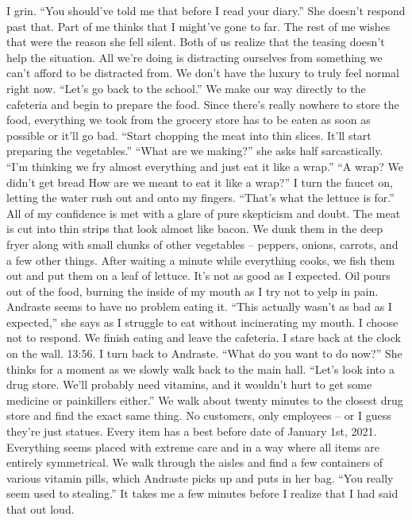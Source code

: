 \documentclass[a4paper, 12pt]{book}
\newcommand\tab[1][1cm]{\hspace*{#1}}
\begin{document}
\newline
\tab
I grin. ``You should’ve told me that before I read your diary.'' 
\newline
\tab
She doesn’t respond past that. Part of me thinks that I might’ve gone to far. The rest of me wishes that were the reason she fell silent. Both of us realize that the teasing doesn’t help the situation. All we’re doing is distracting ourselves from something we can’t afford to be distracted from. We don’t have the luxury to truly feel normal right now. ``Let’s go back to the school.''
\newline
\tab
We make our way directly to the cafeteria and begin to prepare the food. Since there’s really nowhere to store the food, everything we took from the grocery store has to be eaten as soon as possible or it’ll go bad. ``Start chopping the meat into thin slices. It’ll start preparing the vegetables.''
\newline
\tab
``What are we making?'' she asks half sarcastically.
\newline
\tab
``I’m thinking we fry almost everything and just eat it like a wrap.''
\newline
\tab
``A wrap? We didn’t get bread How are we meant to eat it like a wrap?''
\newline
\tab
I turn the faucet on, letting the water rush out and onto my fingers. ``That’s what the lettuce is for.'' All of my confidence is met with a glare of pure skepticism and doubt.
\newline
\tab
The meat is cut into thin strips that look almost like bacon. We dunk them in the deep fryer along with small chunks of other vegetables -- peppers, onions, carrots, and a few other things. After waiting a minute while everything cooks, we fish them out and put them on a leaf of lettuce. It’s not as good as I expected. Oil pours out of the food, burning the inside of my mouth as I try not to yelp in pain. Andraste seems to have no problem eating it. ``This actually wasn’t as bad as I expected,'' she says as I struggle to eat without incinerating my mouth. I choose not to respond.
\newline
\tab
We finish eating and leave the cafeteria. I stare back at the clock on the wall. 13:56. I turn back to Andraste. ``What do you want to do now?''
\newline
\tab
She thinks for a moment as we slowly walk back to the main hall. ``Let’s look into a drug store. We’ll probably need vitamins, and it wouldn’t hurt to get some medicine or painkillers either.'' We walk about twenty minutes to the closest drug store and find the exact same thing. No customers, only employees -- or I guess they’re just statues. Every item has a best before date of January 1st, 2021. Everything seems placed with extreme care and in a way where all items are entirely symmetrical. We walk through the aisles and find a few containers of various vitamin pills, which Andraste picks up and puts in her bag. ``You really seem used to stealing.'' It takes me a few minutes before I realize that I had said that out loud.
\end{document}
